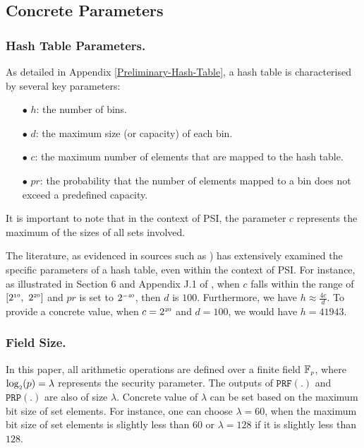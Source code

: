 


\subsection{Concrete Parameters}\label{sec::conc-parameters}

\subsubsection{Hash Table Parameters.}


As detailed in Appendix \ref{Preliminary-Hash-Table}, a hash table is characterised by several key parameters:

\begin{itemize}

\item[$\bullet$] $h$: the number of bins.

\item[$\bullet$] $d$: the maximum size (or capacity) of each bin.

\item[$\bullet$] $c$: the maximum number of elements that are mapped to the hash table.

\item[$\bullet$] $pr$: the probability that the number of elements mapped to a bin does not exceed a predefined capacity.
 
 \end{itemize}
 
 It is important to note that in the context of PSI, the parameter $c$ represents the maximum of the sizes of all sets involved. 
 
 The literature, as evidenced in sources such as \cite{Feather2020-full,DBLP:conf/ccs/KolesnikovMPRT17,DBLP:conf/uss/Pinkas0SZ15}) has extensively examined the specific parameters of a hash table, even within the context of PSI. For instance, as illustrated in Section 6 and Appendix J.1 of \cite{Feather2020-full}, when $c$ falls within the range of  $[2^{\st 10},\ 2^{\st 20}]$ and $pr$ is set to $2^{\scriptscriptstyle -40}$, then $d$ is $100$. Furthermore, we have $h\approx\frac{4c}{d}$. To provide a concrete value, when $c=2^{\scriptscriptstyle 20}$ and $d=100$, we would have $h=41943$. 




\subsubsection{Field Size.} 
%
In this paper, all arithmetic operations are defined over a finite field $\mathbb{F}_{\scriptscriptstyle p}$, where $\log_{\scriptscriptstyle 2}(p)=\lambda$ represents the security parameter. The outputs of $\mathtt {PRF}(.)$ and  $\mathtt {PRP}(.) $ are also of size $\lambda$. Concrete value of $\lambda$ can be set based on the maximum bit size of set elements. For instance, one can choose $\lambda = 60$, when the maximum bit size of set elements is slightly less than $60$ or  $\lambda = 128$ if it is slightly less than $128$. 




